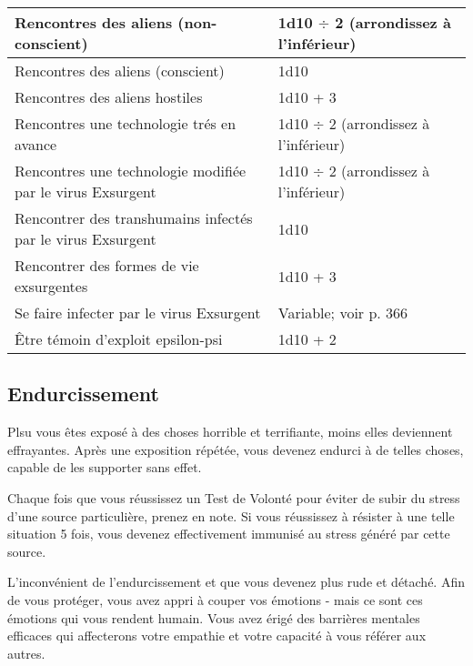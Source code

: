 \begin{table}
\begin{tabularx}{\textwidth}{|X|l|}
Rencontres des aliens (non-conscient)	&1d10 $\div$ 2 (arrondissez à l'inférieur)	\\ \hline

Rencontres des aliens (conscient)	&1d10	\\ \hline

Rencontres des aliens hostiles	&1d10 + 3	\\ \hline

Rencontres une technologie trés en avance	&1d10 $\div$ 2 (arrondissez à l'inférieur)	\\ \hline

Rencontres une technologie modifiée par le virus Exsurgent	&1d10 $\div$ 2 (arrondissez à l'inférieur)	\\ \hline

Rencontrer des transhumains infectés par le virus Exsurgent	&1d10	\\ \hline

Rencontrer des formes de vie exsurgentes	&1d10 + 3	\\ \hline

Se faire infecter par le virus Exsurgent	&Variable; voir p. 366	\\ \hline

Être témoin d'exploit epsilon-psi	&1d10 + 2	\\ \hline

\end{tabularx} \label{tab:stressful-experiences} \end{table} 



\subsection{Endurcissement} \label{sec:hardening} 

Plsu vous êtes exposé à des choses horrible et terrifiante, moins elles deviennent effrayantes. Après une exposition répétée, vous devenez endurci à de telles choses, capable de les supporter sans effet. 

Chaque fois que vous réussissez un Test de Volonté pour éviter de subir du stress d'une source particulière, prenez en note. Si vous réussissez à résister à une telle situation 5 fois, vous devenez effectivement immunisé au stress généré par cette source. 

L'inconvénient de l'endurcissement et que vous devenez plus rude et détaché. Afin de vous protéger, vous avez appri à couper vos émotions - mais ce sont ces émotions qui vous rendent humain. Vous avez érigé des barrières mentales efficaces qui affecterons votre empathie et votre capacité à vous référer aux autres. 

